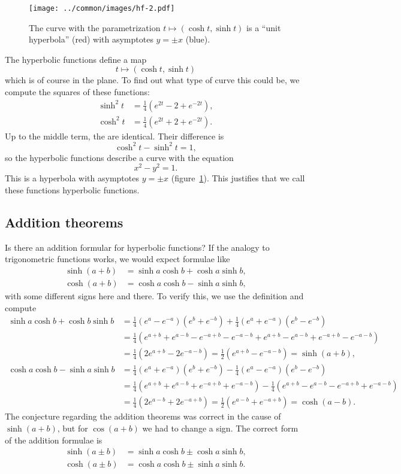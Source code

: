 \begin{figure}
\centering
\texttt{[image: ../common/images/hf-2.pdf]}
\caption{The curve with the parametrization
$t\mapsto (\cosh t, \sinh t)$ is a ``unit hyperbola'' (red) with 
asymptotes
$y=\pm x$ (blue).
\label{anhang:hyperbel}}
\end{figure}
The hyperbolic functions define a map
\[
t\mapsto (\cosh t, \sinh t)
\]
which is of course in the plane.
To find out what type of curve this could be, we compute the
squares of these functions:
\begin{align}
\sinh^2 t&=\frac14(e^{2t}-2+e^{-2t}),
\\
\cosh^2 t&=\frac14(e^{2t}+2+e^{-2t}).
\label{hyp:definition}
\end{align}
Up to the middle term, the are identical.
Their difference is
\[
\cosh^2t - \sinh^2t=1,
\]
so the hyperbolic functions describe a curve with the equation
\[
x^2-y^2=1.
\]
This is a hyperbola with asymptotes $y=\pm x$
(figure~\ref{anhang:hyperbel}).
This justifies that we call these functions hyperbolic functions.

\subsection{Addition theorems}
Is there an addition formular for hyperbolic functions?
If the analogy to trigonometric functions works, we would expect 
formulae like
\begin{align*}
\sinh(a+b)&=\sinh a\cosh b + \cosh a\sinh b,\\
\cosh(a+b)&=\cosh a\cosh b - \sinh a\sinh b,
\end{align*}
with some different signs here and there.
To verify this, we use the definition and compute
\begin{align*}
\sinh a\cosh b + \cosh b\sinh b
&=
\frac14(e^a-e^{-a})(e^b+e^{-b})
+
\frac14(e^a+e^{-a})(e^b-e^{-b})
\\
&=\frac14(e^{a+b}+e^{a-b}-e^{-a+b}-e^{-a-b} + e^{a+b}-e^{a-b}+e^{-a+b}-e^{-a-b})
\\
&=
\frac14(2e^{a+b}-2e^{-a-b})
=
\frac12(e^{a+b}-e^{-a-b})=\sinh(a+b),
\\
\cosh a\cosh b-\sinh a\sinh b
&=
\frac14(e^a+e^{-a})(e^b+e^{-b})
-
\frac14(e^a-e^{-a})(e^b-e^{-b})
\\
&=
\frac14(e^{a+b}+e^{a-b}+e^{-a+b}+e^{-a-b})
-
\frac14(e^{a+b}-e^{a-b}-e^{-a+b}+e^{-a-b})
\\
&=
\frac14(2e^{a-b}+2e^{-a+b})
=
\frac12(e^{a-b}+e^{-a+b})=\cosh(a-b).
\end{align*}
The conjecture regarding the addition theorems was correct in the cause
of $\sinh(a+b)$, but for $\cos(a+b)$ we had to change a sign.
The correct form of the addition formulae is
\begin{align*}
\sinh(a\pm b)&=\sinh a\cosh b \pm \cosh a\sinh b,\\
\cosh(a\pm b)&=\cosh a\cosh b \pm \sinh a\sinh b.
\end{align*}


